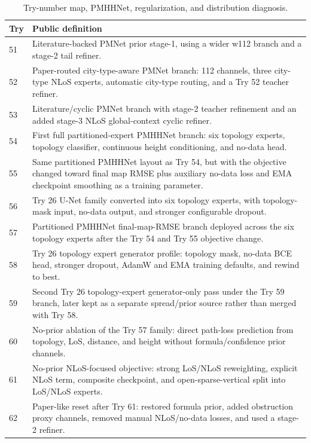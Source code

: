 \begin{table}[H]
\centering
\caption{Try-number map, PMHHNet, regularization, and distribution diagnosis.}
\label{tab:try_map_pmhhnet}
\tiny
\renewcommand{\arraystretch}{0.78}
\setlength{\tabcolsep}{2pt}
\begin{tabularx}{\textwidth}{p{}>{\raggedright\arraybackslash}X}
\toprule
Try & Public definition \\
\midrule
51 & Literature-backed PMNet prior stage-1, using a wider w112 branch and a stage-2 tail refiner. \\
52 & Paper-routed city-type-aware PMNet branch: 112 channels, three city-type NLoS experts, automatic city-type routing, and a Try 52 teacher refiner. \\
53 & Literature/cyclic PMNet branch with stage-2 teacher refinement and an added stage-3 NLoS global-context cyclic refiner. \\
54 & First full partitioned-expert PMHHNet branch: six topology experts, topology classifier, continuous height conditioning, and no-data head. \\
55 & Same partitioned PMHHNet layout as Try 54, but with the objective changed toward final map RMSE plus auxiliary no-data loss and EMA checkpoint smoothing as a training parameter. \\
56 & Try 26 U-Net family converted into six topology experts, with topology-mask input, no-data output, and stronger configurable dropout. \\
57 & Partitioned PMHHNet final-map-RMSE branch deployed across the six topology experts after the Try 54 and Try 55 objective change. \\
58 & Try 26 topology expert generator profile: topology mask, no-data BCE head, stronger dropout, AdamW and EMA training defaults, and rewind to best. \\
59 & Second Try 26 topology-expert generator-only pass under the Try 59 branch, later kept as a separate spread/prior source rather than merged with Try 58. \\
60 & No-prior ablation of the Try 57 family: direct path-loss prediction from topology, LoS, distance, and height without formula/confidence prior channels. \\
61 & No-prior NLoS-focused objective: strong LoS/NLoS reweighting, explicit NLoS term, composite checkpoint, and open-sparse-vertical split into LoS/NLoS experts. \\
62 & Paper-like reset after Try 61: restored formula prior, added obstruction proxy channels, removed manual NLoS/no-data losses, and used a stage-2 refiner. \\

\end{tabularx}
\end{table}
